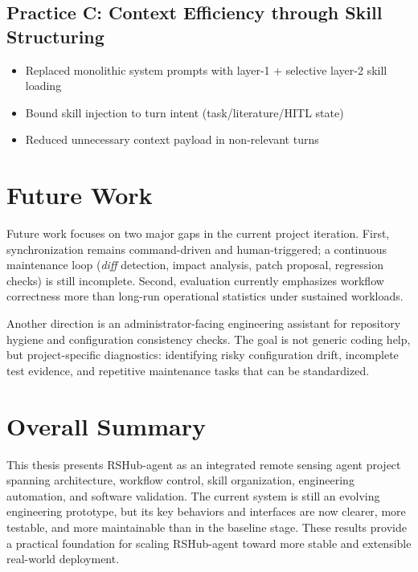 \subsection{Practice C: Context Efficiency through Skill Structuring}
\begin{itemize}
	\item Replaced monolithic system prompts with layer-1 + selective layer-2 skill loading
	\item Bound skill injection to turn intent (task/literature/HITL state)
	\item Reduced unnecessary context payload in non-relevant turns
\end{itemize}

\section{Future Work}
\label{sec:future-work}

Future work focuses on two major gaps in the current project iteration.
First, synchronization remains command-driven and human-triggered; a continuous maintenance loop (\textit{diff} detection, impact analysis, patch proposal, regression checks) is still incomplete.
Second, evaluation currently emphasizes workflow correctness more than long-run operational statistics under sustained workloads.

Another direction is an administrator-facing engineering assistant for repository hygiene and configuration consistency checks.
The goal is not generic coding help, but project-specific diagnostics: identifying risky configuration drift, incomplete test evidence, and repetitive maintenance tasks that can be standardized.

\section{Overall Summary}

This thesis presents RSHub-agent as an integrated remote sensing agent project spanning architecture, workflow control, skill organization, engineering automation, and software validation.
The current system is still an evolving engineering prototype, but its key behaviors and interfaces are now clearer, more testable, and more maintainable than in the baseline stage.
These results provide a practical foundation for scaling RSHub-agent toward more stable and extensible real-world deployment.
